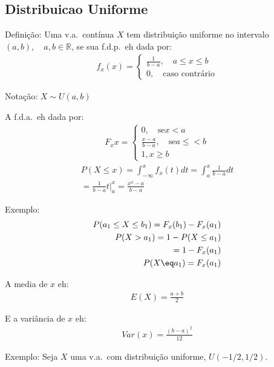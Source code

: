    \subsection{Distribuicao Uniforme} 
   \begin{description}
     \item {Definição}: Uma v.a.\ contínua $X$ tem distribuição uniforme no intervalo $(a,b), \quad a,b \in \mathbb{R}$,
       se sua f.d.p.\ eh dada por:
\begin{align}
  f_x(x) = \begin{cases}
\frac{1}{b-a}, \quad a \leq x \leq b  \\
   0, \quad \text{caso contrário}
  \end{cases}
\end{align}
\item{Notação}: $X \mathtt{\sim} U(a,b)$
\item A f.d.a.\ eh dada por:
  \begin{align}
    F_x{x} = \begin{cases}
      0, \quad \text{se} x<a \\
      \frac{x-a}{b-a}, \quad \text{se} a\leq<b\\
      1, x \ge b
    \end{cases}
  \end{align}
  \begin{align}
    P(X \leq x) = \int_{- \infty}^{x} f_{x} (t) dt = \int_{a}^{x} \frac{1}{b-a} dt\\
    \nonumber = \frac{1}{b-a}t |_{a}^{x} = \frac{x^a -a}{b-a}
  \end{align}
\item{Exemplo}:
  \begin{align*}
    P(a_1 \leq X \leq b_1) = F_{x} (b_1) - F_{x}(a_1) \\
    P(X > a_1)= 1- P(X \leq a_1) \\
    = 1-F_{x} (a_1) \\
    P(X \eq a_1)= F_{x}(a_1)
  \end{align*}
 \item A media de $x$ eh:
   \begin{align*}
     E(X) = \frac{a+b}{2}
   \end{align*}
 \item E a variância de $x$ eh:
   \begin{align*}
     Var(x) = \frac{ \left(b-a\right)^2 }{12}
   \end{align*}
   \item{Exemplo}: Seja $X$ uma v.a.\ com distribuição uniforme, $U(-1/2 , 1/2). $

\end{description}
